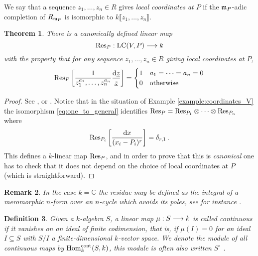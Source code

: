 \documentclass[english,letter paper,12pt,reqno]{article}
\newtheorem{theorem}{Theorem}[section]
\theoremstyle{example}
\newtheorem{definition}[theorem]{Definition}
\newtheorem{remark}[theorem]{Remark}
\numberwithin{equation}{section}
\def\Hom{\operatorname{Hom}}
\DeclareMathOperator{\LC}{LC}
\begin{document}
We say that a sequence $z_1,\ldots,z_n \in R$ gives \emph{local coordinates at $P$} if the $\mathfrak{m}_P$-adic completion of $R_{\mathfrak{m}_P}$ is isomorphic to $k \llbracket z_1,\ldots,z_n \rrbracket$.


  
\begin{theorem}\label{theorem:compute_res} There is a canonically defined linear map
\[
\Res_{P}: \LC(V,P) \lto k
\]
with the property that for any sequence $z_1,\ldots,z_n \in R$ giving local coordinates at $P$,
\[
\operatorname{Res}\!_{P} \left[ \frac{1}{z_1^{a_1}, \ldots, z_n^{a_n}} \frac{\operatorname{d}\!{\underline{z}}}{\underline{z}} \right] = \begin{cases} 1 & a_1 = \cdots = a_n = 0 \\ 0 & \textup{otherwise} \end{cases}
\]
\end{theorem} 
\begin{proof}
See \cite[\S 5.3]{Lipman01}, \cite[pp.64--67]{Lipman84} or \cite{Kunz08}. Notice that in the situation of Example \ref{example:coordinates_V} the isomorphism \eqref{eq:one_to_general} identifies $\operatorname{Res}\!_{P} = \operatorname{Res}\!_{P_1} \otimes \cdots \otimes \operatorname{Res}\!_{P_n}$ where
\[
\operatorname{Res}\!_{P_i} \left[ \frac{\operatorname{d}\!{x}}{(x_i-P_i)^r} \right] = \delta_{r,1}\,.
\]
This defines a $k$-linear map $\operatorname{Res}\!_P$, and in order to prove that this is \emph{canonical} one has to check that it does not depend on the choice of local coordinates at $P$ (which is straightforward).
\end{proof}

\begin{remark} In the case $k = \mathbb{C}$ the residue may be defined as the integral of a meromorphic $n$-form over an $n$-cycle which avoids its poles, see for instance \cite[Chapter V]{Griffiths}.
\end{remark}

\begin{definition} Given a $k$-algebra $S$, a linear map $\mu: S \longrightarrow k$ is called \emph{continuous} if it vanishes on an ideal of finite codimension, that is, if $\mu( I ) = 0$ for an ideal $I \subseteq S$ with $S/I$ a finite-dimensional $k$-vector space. We denote the module of all continuous maps by $\Hom_k^{\cont}(S,k)$, this module is often also written $S^{\circ}$ \cite[Chapter 6]{sweedler}.
\end{definition}
\end{document}
